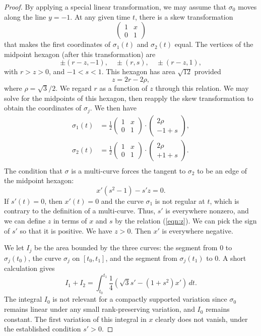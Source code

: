 \documentclass[11pt]{amsart}
\begin{document}
\begin{proof} By applying a special linear transformation, we may
  assume that $\sigma_0$ moves along the line $y=-1$.  At any given
  time $t$, there is a skew transformation
  \def\xm{\left(\begin{matrix} 1& x\\0&1\end{matrix}\right)}
  \def\vc#1#2{\left(\begin{matrix}#1\\#2\end{matrix}\right)}
\[
\xm
\]
that makes the first coordinates of $\sigma_1(t)$ and $\sigma_2(t)$
equal.  The vertices of the midpoint hexagon (after this
transformation) are
\[
\pm (r-z,-1), \quad \pm (r,s),\quad \pm (r-z,1),
\]
with $r>z>0$, and $-1<s<1$.  This hexagon has area $\sqrt{12}$
provided
\[
z = 2 r - 2 \rho,
\]
where $\rho = \sqrt3/2$.  We regard $r$ as a function of $z$ through
this relation. We may solve for the midpoints of this
hexagon, then reapply the skew transformation to obtain the
coordinates of $\sigma_j$.  We then have
\[
\begin{array}{lll}
\sigma_1(t) &= \frac12\xm\cdot\vc {2\rho}{-1+s},\\
\sigma_2(t) &= \frac12\xm\cdot\vc {2\rho}{+1+s}.\\
\end{array}
\]
The condition that $\sigma$ is a multi-curve forces the tangent to $\sigma_2$
to be an edge of the midpoint hexagon:
\begin{equation}\label{eqn:z}
x' (s^2 - 1) - s' z = 0.
\end{equation}
If $s'(t)=0$, then $x'(t)=0$ and the curve $\sigma_1$ is not regular
at $t$, which is contrary to the definition of a multi-curve.  Thus,
$s'$ is everywhere nonzero, and we can define $z$ in terms of $x$ and
$s$ by the relation (\ref{eqn:z}).  We can pick the sign of $s'$ so
that it is positive.  We have $z >0$.  Then $x'$ is
everywhere negative.

We let $I_j$ be the area bounded by the three curves: the segment from
$0$ to $\sigma_j(t_0)$, the curve $\sigma_j$ on $[t_0,t_1]$, and the
segment from $\sigma_j(t_1)$ to $0$.  A short calculation gives
\[
I_1 + I_2 = \int_{t_0}^{t_1} \frac{1}4 (\sqrt{3} s' - (1+s^2) x')\,dt.
\]
The integral $I_0$ is not relevant for a compactly supported variation
since $\sigma_0$ remains linear under any small rank-preserving
variation, and $I_0$ remains constant.  The first variation of this integral in $x$ clearly does
not vanish, under the established condition $s'>0$.
\end{proof}
\end{document}
